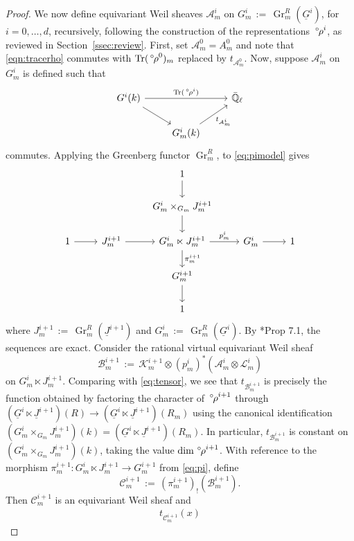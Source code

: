 \documentclass[10pt]{amsart}
\theoremstyle{plain}
\theoremstyle{definition}
\newcommand{\EE}{\mathbb{\bar Q}_\ell}
\newcommand{\Fq}{k}
\DeclareMathOperator{\Gr}{Gr}
\DeclareMathOperator{\trace}{Tr}
\newcommand{\ceq}{{\, :=\, }}
\newcommand{\trFrob}[1]{t_{#1}}
\newcommand{\cs}[1]{{\mathcal{#1}}}
\newcommand{\orho}{{\,^\circ \hskip-1pt \rho}}
\begin{document}
\begin{proof}
We now define equivariant Weil sheaves $\cs{A}^i_m$ on $G_m^i \ceq \Gr^{R}_m(\underline{G}^{i})$, for $i=0,\ldots ,d$, recursively, following the construction of the representations $\orho^i$, as reviewed in Section~\ref{ssec:review}.
First, set $\cs{A}_m^0 = A_m^0$ and note that \eqref{eqn:tracerho} commutes with $\trace(\orho^0)_m$ replaced by $\trFrob{\cs{A}_m^0}$.
Now, suppose $\cs{A}^i_m$ on $G_m^i$ is defined such that
\[
\begin{tikzcd}
G^i(\Fq) \arrow{rr}{\trace(\orho^i)} \arrow{rd} && \EE\\
& G_m^i(\Fq) \arrow{ru}[swap]{\trFrob{\cs{A}_m^i}} & 
\end{tikzcd}
\]
commutes.
Applying the Greenberg functor $\Gr^{R}_m$, to \eqref{eq:pimodel} gives
\begin{equation}\label{eq:pi}
\begin{tikzcd}
\ && 1 \arrow{d} && \\
\ && G_m^{i}\times_{G_m} J_m^{i+1} \arrow{d} && \\
1 \arrow{r} &J_m^{i+1} \arrow{r} & G_m^i \ltimes J_m^{i+1} \arrow{d}{\pi_m^{i+1}} \arrow{r}{p_m^{i}} & G_m^i \arrow{r} & 1\\
&& G_m^{i+1} \arrow{d} && \\
&& 1 && 
\end{tikzcd}
\end{equation}
where $J_m^{i+1} \ceq \Gr^{R}_m(\underline{J}^{i+1})$ and $G_m^{i} \ceq \Gr^{R}_m(\underline{G}^{i})$.
By \cite{bertapelle-gonzales:Greenberg}*{Prop 7.1}, the sequences are exact.
Consider the rational virtual equivariant Weil sheaf 
\[
\cs{B}_m^{i+1} \ceq \cs{K}_m^{i+1} \otimes (p_m^{i})^*(\cs{A}_m^{i}\otimes \cs{L}_m^{i})
\]
on $G_m^{i}\ltimes J_m^{i+1}$.
Comparing with \eqref{eq:tensor}, we see that $\trFrob{\cs{B}_m^{i+1}}$ is precisely the function obtained by factoring the character of $\orho^{i+1}$ through $(\underline{G}^{i}\ltimes \underline{J}^{i+1})(R) \to (\underline{G}^{i}\ltimes \underline{J}^{i+1})(R_m)$ using the canonical identification $(G_m^{i}\times_{G_m} J_m^{i+1})(\Fq) =  (\underline{G}^{i}\ltimes \underline{J}^{i+1})(R_m)$. 
In particular, $\trFrob{\cs{B}^{i+1}_m}$ is constant on $(G_m^{i}\times_{G_m} J_m^{i+1})(\Fq)$, taking the value $\dim \orho^{i+1}$.
With reference to the morphism $\pi_m^{i+1} : G_m^i \ltimes J_m^{i+1} \to G_m^{i+1}$ from \eqref{eq:pi}, define 
\[
\cs{C}_m^{i+1} \ceq (\pi_m^{i+1})_! (\cs{B}_m^{i+1}).
\]
Then $\cs{C}_m^{i+1}$ is an equivariant Weil sheaf and
\begin{eqnarray*}
\trFrob{\cs{C}^{i+1}_m}(x)

\end{eqnarray*}
\end{proof}
\end{document}
